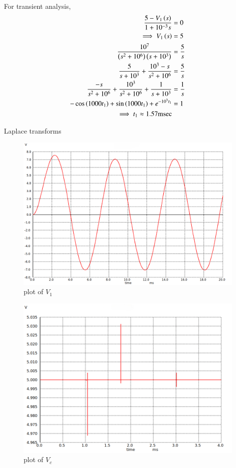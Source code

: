 \documentclass[journal,12pt,twocolumn]{IEEEtran}
\begin{document}
For transient analysis,
\begin{align}
    \frac{5-V_1\left(s\right)}{1+10^{-3}s} &= 0\\
    \implies V_1\left(s\right) &= 5\\
    \frac{10^7}{\left(s^2+10^6\right)\left(s+10^3\right)} &= \frac{5}{s}\\
    \frac{5}{s+10^3} + \frac{10^3-s}{s^2 + 10^6} &= \frac{5}{s}\\
    \frac{-s}{s^2+10^6} + \frac{10^3}{s^2 + 10^6} + \frac{1}{s+10^3} &= \frac{1}{s}\\
    -\cos\left(1000t_1\right)+\sin\left(1000t_1\right)+e^{-10^3 t_1} &= 1\\
    \implies t_1 \approx 1.57\text{msec}
\end{align}



\begin{table}[ht]
    
    \vspace{0.5cm}
    \caption{Laplace transforms}
    \label{tab:Gate.ee.54.1}
\end{table}

\begin{figure}[ht]
    \centering
    \includegraphics[width=1\columnwidth]{figs/fig1.png}
    \caption{plot of $V_1$}
    \label{fig:fig1.gate.ee.23.54}
\end{figure}

\begin{figure}[ht]
    \centering
    \includegraphics[width=1\columnwidth]{figs/fig2.png}
    \caption{plot of $V_c$}
    \label{fig:fig2.gate.ee.23.54}
\end{figure}
\end{document}
